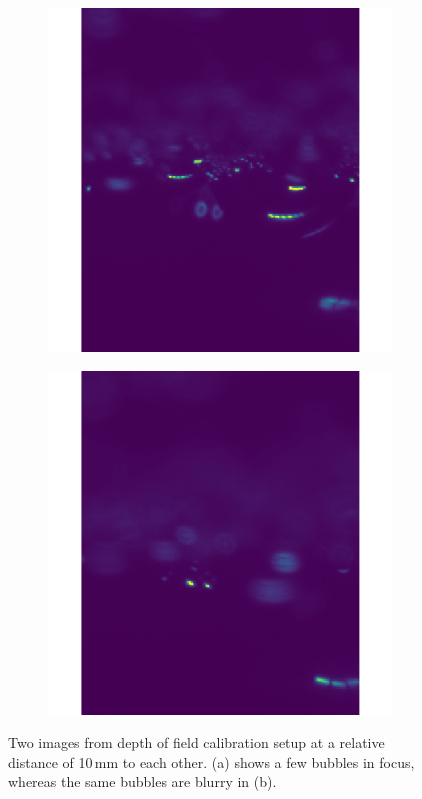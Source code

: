 			\begin{figure}
				\begin{subfigure}[b]{.55\textwidth}
					\centering
					\includegraphics[scale=.4]{images/dof_calib_1.png}
					\caption{}
				\end{subfigure}%
				\begin{subfigure}[b]{.55\textwidth}
					\centering
					\includegraphics[scale=.4]{images/dof_calib_2.png}
					\caption{}
				\end{subfigure}
				\caption{Two images from depth of field calibration setup at a relative distance of 10\,mm to each other. (a) shows a few bubbles in focus, whereas the same bubbles are blurry in (b). }								
				\label{fig:depth_of_field_setup_result}
			\end{figure}
			
